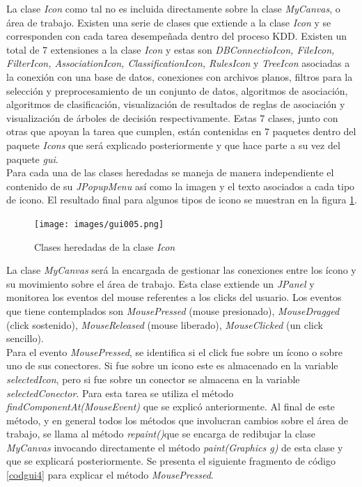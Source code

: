 La clase \textit{Icon} como tal no es incluida directamente sobre la clase \textit{MyCanvas}, o \'area de trabajo.
Existen una serie de clases que extiende a la clase \textit{Icon} y se corresponden con cada tarea desempe\~nada
dentro del proceso KDD.  Existen un total de 7 extensiones a la clase \textit{Icon} y estas son
\textit{DBConnectioIcon, FileIcon, FilterIcon, AssociationIcon, ClassificationIcon, RulesIcon} y \textit{TreeIcon}
asociadas a la conexi\'on con una base de datos, conexiones con archivos planos, filtros para la selecci\'on y
preprocesamiento de un conjunto de datos, algoritmos de asociaci\'on, algoritmos de clasificaci\'on,
visualizaci\'on de resultados de reglas de asociaci\'on y visualizaci\'on de \'arboles de decisi\'on
respectivamente.  Estas 7 clases, junto con otras que apoyan la tarea que cumplen, est\'an contenidas en 7
paquetes dentro del paquete \textit{Icons} que ser\'a explicado posteriormente y que hace parte a su vez del
paquete \textit{gui}.\\

Para cada una de las clases heredadas se maneja de manera independiente el contenido de su \textit{JPopupMenu}
as\'i como la imagen y el texto asociados a cada tipo de icono.  El resultado final para algunos tipos de icono se
muestran en la figura \ref{gui005}.

\begin{figure}[h]
\centering
\texttt{[image: images/gui005.png]}
\caption{Clases heredadas de la clase \textit{Icon} }
\label{gui005}
\end{figure}

La clase \textit{MyCanvas} ser\'a la encargada de gestionar las conexiones entre los \'icono y su movimiento sobre
el \'area de trabajo.  Esta clase extiende un \textit{JPanel} y monitorea los eventos del mouse referentes a los
clicks del usuario.  Los eventos que tiene contemplados son \textit{MousePressed} (mouse presionado),
\textit{MouseDragged} (click sostenido), \textit{MouseReleased} (mouse liberado), \textit{MouseClicked} (un click
sencillo).\\

Para el evento \textit{MousePressed}, se identifica si el click fue sobre un \'icono o sobre uno de sus
conectores. Si fue sobre un icono este es almacenado en la variable \textit{selectedIcon}, pero si fue sobre un
conector se almacena en la variable \textit{selectedConector}.  Para esta tarea se utiliza el m\'etodo
\textit{findComponentAt(MouseEvent)}  que se explic\'o anteriormente.  Al final de este m\'etodo, y en general
todos los m\'etodos que involucran cambios sobre el \'area de trabajo, se llama al m\'etodo \textit{repaint()}que
se encarga de redibujar la clase \textit{MyCanvas} invocando directamente el m\'etodo \textit{paint(Graphics g)}
de esta clase y que se explicar\'a posteriormente.  Se presenta el siguiente fragmento de c\'odigo \ref{codgui4}
para explicar el m\'etodo \textit{MousePressed}.\\

